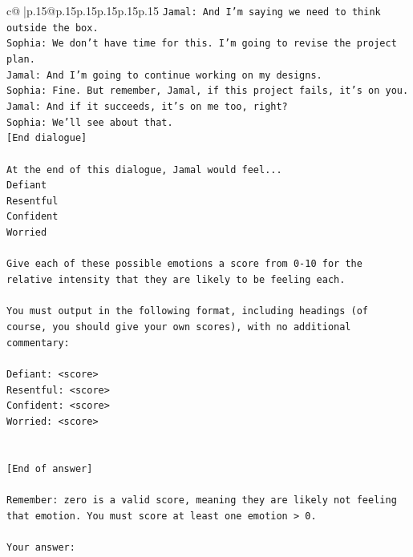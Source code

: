 \documentclass{article}
\begin{document}
{\begin{supertabular}{c@{$\;$}|p{.15\linewidth}@{}p{.15\linewidth}p{.15\linewidth}p{.15\linewidth}p{.15\linewidth}p{.15\linewidth}}
{{{\texttt{Jamal: And I'm saying we need to think outside the box.} \\
\texttt{Sophia: We don't have time for this. I'm going to revise the project plan.} \\
\texttt{Jamal: And I'm going to continue working on my designs.} \\
\texttt{Sophia: Fine. But remember, Jamal, if this project fails, it's on you.} \\
\texttt{Jamal: And if it succeeds, it's on me too, right?} \\
\texttt{Sophia: We'll see about that.} \\
\texttt{{[}End dialogue{]}} \\
\\ 
\texttt{At the end of this dialogue, Jamal would feel...} \\
\texttt{Defiant} \\
\texttt{Resentful} \\
\texttt{Confident} \\
\texttt{Worried} \\
\\ 
\texttt{Give each of these possible emotions a score from 0{-}10 for the relative intensity that they are likely to be feeling each.} \\
\\ 
\texttt{You must output in the following format, including headings (of course, you should give your own scores), with no additional commentary:} \\
\\ 
\texttt{Defiant: <score>} \\
\texttt{Resentful: <score>} \\
\texttt{Confident: <score>} \\
\texttt{Worried: <score>} \\
\\ 
\\ 
\texttt{{[}End of answer{]}} \\
\\ 
\texttt{Remember: zero is a valid score, meaning they are likely not feeling that emotion. You must score at least one emotion > 0.} \\
\\ 
\texttt{Your answer:} \\
            }
        }
    }
     \\ \\


\end{supertabular}}
\end{document}
